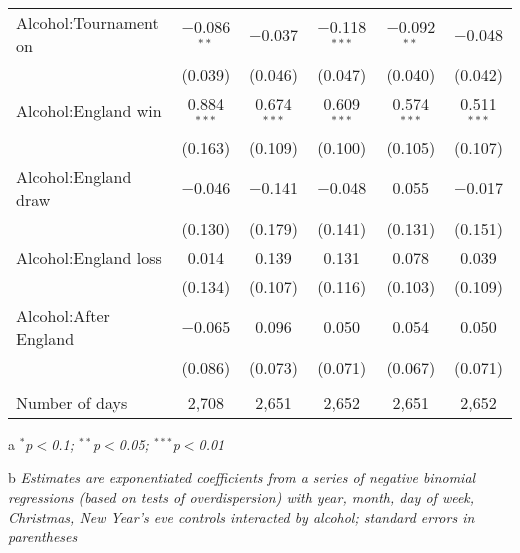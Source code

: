\documentclass[12pt, a4paper]{article}
\begin{document}
\begin{table}[htp]
{\begin{threeparttable}
\begin{tabular}{@{\extracolsep{5pt}}lccccc}
  Alcohol:Tournament on & $-$0.086$^{**}$ & $-$0.037 & $-$0.118$^{***}$ & $-$0.092$^{**}$ & $-$0.048 \\ 
  & (0.039) & (0.046) & (0.047) & (0.040) & (0.042) \\ 
  Alcohol:England win & 0.884$^{***}$ & 0.674$^{***}$ & 0.609$^{***}$ & 0.574$^{***}$ & 0.511$^{***}$ \\ 
  & (0.163) & (0.109) & (0.100) & (0.105) & (0.107) \\ 
  Alcohol:England draw & $-$0.046 & $-$0.141 & $-$0.048 & 0.055 & $-$0.017 \\ 
  & (0.130) & (0.179) & (0.141) & (0.131) & (0.151) \\ 
  Alcohol:England loss & 0.014 & 0.139 & 0.131 & 0.078 & 0.039 \\ 
  & (0.134) & (0.107) & (0.116) & (0.103) & (0.109) \\ 
  Alcohol:After England & $-$0.065 & 0.096 & 0.050 & 0.054 & 0.050 \\ 
  & (0.086) & (0.073) & (0.071) & (0.067) & (0.071) \\ 
 \hline \\[-1.8ex] 
Number of days & 2,708 & 2,651 & 2,652 & 2,651 & 2,652 \\ 
\hline 

\end{tabular}
\begin{tablenotes}
      \item[a] \textit{$^{*}$p$<$0.1; $^{**}$p$<$0.05; $^{***}$p$<$0.01}
      \item[b] \textit{Estimates are exponentiated coefficients from a series of negative binomial regressions (based on tests of overdispersion)  with year, month, day of week, Christmas, New Year's eve controls interacted by alcohol; standard errors in parentheses}
    \end{tablenotes}
\end{threeparttable} } 
\end{table}
\end{document}
